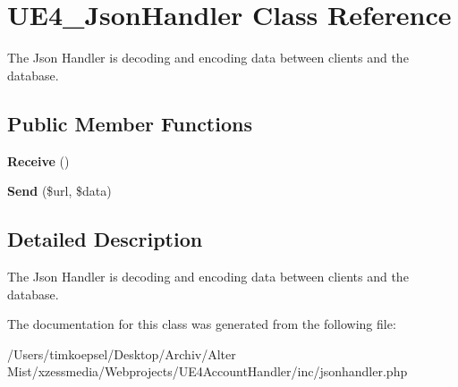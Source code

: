 \hypertarget{class_u_e4___json_handler}{\section{U\-E4\-\_\-\-Json\-Handler Class Reference}
\label{class_u_e4___json_handler}
}


The Json Handler is decoding and encoding data between clients and the database.  


\subsection*{Public Member Functions}
\begin{DoxyCompactItemize}
\item 
\hypertarget{class_u_e4___json_handler_a23e99262c97e03e4fc6548a309e1ebc2}{{\bfseries Receive} ()}\label{class_u_e4___json_handler_a23e99262c97e03e4fc6548a309e1ebc2}

\item 
\hypertarget{class_u_e4___json_handler_a6c5a7a59e0b774a32ea2718fc740c818}{{\bfseries Send} (\$url, \$data)}\label{class_u_e4___json_handler_a6c5a7a59e0b774a32ea2718fc740c818}

\end{DoxyCompactItemize}


\subsection{Detailed Description}
The Json Handler is decoding and encoding data between clients and the database. 

The documentation for this class was generated from the following file\-:\begin{DoxyCompactItemize}
\item 
/\-Users/timkoepsel/\-Desktop/\-Archiv/\-Alter Mist/xzessmedia/\-Webprojects/\-U\-E4\-Account\-Handler/inc/jsonhandler.\-php\end{DoxyCompactItemize}
